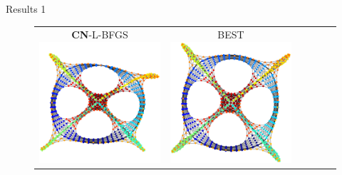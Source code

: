 \documentclass[dvipdfmx,13pt,aspectratio=169]{beamer}
\begin{document}
\begin{frame}{Results 1}
\begin{figure}[h]
\begin{tabular}{cccccc}
      \makecell{\small{\textsf{\textbf{CN}-L-BFGS}}                                                                                                       \\[-0.2em]\includegraphics[width=0.135\columnwidth]{../main/individual/vis/dwt_1005_CN-L-BFGS.png}} &
      \makecell{\small{\textsf{BEST}}                                                                                                                     \\[-0.2em]\includegraphics[width=0.135\columnwidth]{../main/individual/vis/opt_dwt_1005.png}} \\
    \end{tabular}
  \end{figure}
\end{frame}
\end{document}
